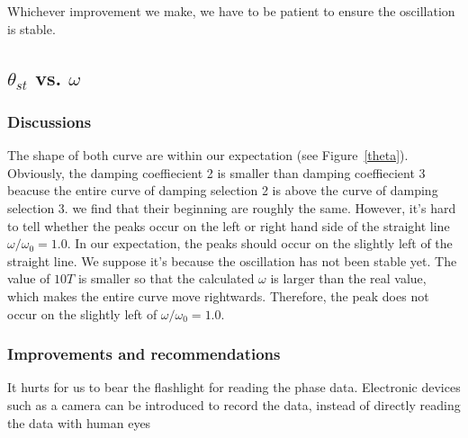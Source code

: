 Whichever improvement we make, we have to be patient to ensure the oscillation
is stable. 

\subsection{$\theta_{st}$ vs. $\omega$}

\subsubsection{Discussions}

The shape of both curve are within our expectation (see Figure~\ref{theta}).
Obviously, the damping coeffiecient 2 is smaller than damping coeffiecient 3
beacuse the entire curve of damping selection 2 is above the curve of damping
selection 3. we find that their beginning are roughly the same. However, it's
hard to tell whether the peaks occur on the left or right hand side of the
straight line $\omega/\omega_0=1.0$. In our expectation, the peaks should occur
on the slightly left of the straight line. We suppose it's because the
oscillation has not been stable yet. The value of $10T$ is smaller so that the
calculated $\omega$ is larger than the real value, which makes the entire curve
move rightwards. Therefore, the peak does not occur on the slightly left of
$\omega/\omega_0=1.0$. 


\subsubsection{Improvements and recommendations}

It hurts for us to bear the flashlight for reading the phase data.
Electronic devices such as a camera can be introduced to record the data, instead of directly reading the data with human eyes